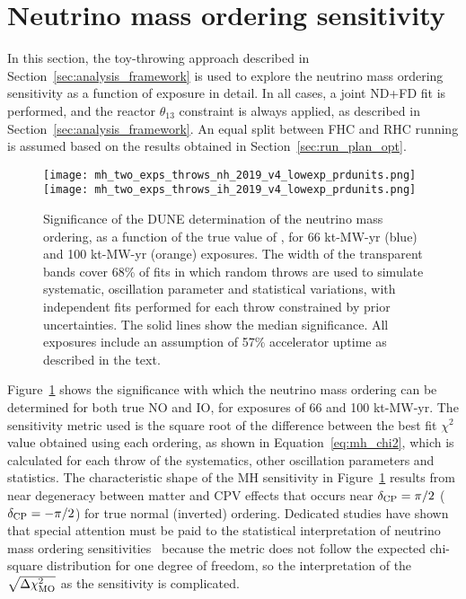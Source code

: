 \section{Neutrino mass ordering sensitivity}
\label{sec:mh_sens}

In this section, the toy-throwing approach described in Section~\ref{sec:analysis_framework} is used to explore the neutrino mass ordering sensitivity as a function of exposure in detail. In all cases, a joint ND+FD fit is performed, and the reactor $\theta_{13}$ constraint is always applied, as described in Section~\ref{sec:analysis_framework}. An equal split between FHC and RHC running is assumed based on the results obtained in Section~\ref{sec:run_plan_opt}.

\begin{figure}[htbp]
  \centering
  \texttt{[image: mh\_two\_exps\_throws\_nh\_2019\_v4\_lowexp\_prdunits.png]}
  \texttt{[image: mh\_two\_exps\_throws\_ih\_2019\_v4\_lowexp\_prdunits.png]}
  \caption{Significance of the DUNE determination of the neutrino mass ordering, as a function of the true value of \deltacp, for 66 kt-MW-yr (blue) and 100 kt-MW-yr (orange) exposures. The width of the transparent bands cover 68\% of fits in which random throws are used to simulate systematic, oscillation parameter and statistical variations, with independent fits performed for each throw constrained by prior uncertainties. The solid lines show the median significance. All exposures include an assumption of 57\% accelerator uptime as described in the text.}
  \label{fig:mh_bands}
\end{figure}
Figure~\ref{fig:mh_bands} shows the significance with which the neutrino mass ordering can be determined for both true NO and IO, for exposures of 66 and 100 kt-MW-yr. The sensitivity metric used is the square root of the difference between the best fit $\chi^{2}$ value obtained using each ordering, as shown in Equation~\ref{eq:mh_chi2}, which is calculated for each throw of the systematics, other oscillation parameters and statistics. The characteristic shape of the MH sensitivity in Figure~\ref{fig:mh_bands} results from near degeneracy between matter and CPV effects that occurs near $\delta_{\rm CP}=\pi/2$ ($\delta_{\rm CP}=-\pi/2$) for true normal (inverted) ordering. Dedicated studies have shown that special attention must be paid to the statistical interpretation of neutrino mass ordering sensitivities~\cite{Ciuffoli:2013rza,Qian:2012zn,Blennow:2013oma} because the \dchisqMO metric does not follow the expected chi-square distribution for one degree of freedom, so the interpretation of the $\sqrt{\Delta\chi^{2}_{\mathrm{MO}}}$ as the sensitivity is complicated.

